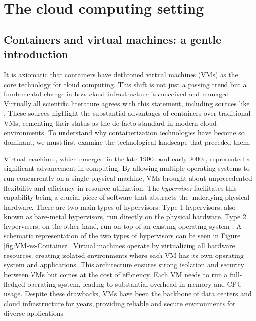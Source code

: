 \chapter{The cloud computing setting}\label{chap:cloudcomputing}


\section{Containers and virtual machines: a gentle introduction}\label{sec:chpt1-containers}

It is axiomatic that containers have dethroned virtual machines (VMs) as the
core technology for cloud computing. This shift is not just a passing trend but
a fundamental change in how cloud infrastructure is conceived and managed.
Virtually all scientific literature agrees with this statement, including
sources like \cite{Casalicchio2020TheSI, Bentaleb2021,
  zhang2018comparativestudycontainersvirtual}. These sources highlight the
substantial advantages of containers over traditional VMs, cementing their
status as the de facto standard in modern cloud environments.
To understand why containerization technologies have become so dominant, we must
first examine the technological landscape that preceded them.

Virtual machines, which emerged in the late 1990s and early 2000s, represented a
significant advancement in computing. By allowing multiple operating systems to
run concurrently on a single physical machine, VMs brought about unprecedented
flexibility and efficiency in resource utilization. The \textit{hypervisor}
facilitates this capability being a crucial piece of software that abstracts the
underlying physical hardware. There are two main types of hypervisors: Type 1
hypervisors, also known as bare-metal hypervisors, run directly on the physical
hardware. Type 2 hypervisors, on the other hand, run on top of an existing
operating system \cite{rodriguezharo-2012}. A schematic representation of the
two types of hypervisors can be seen in Figure \ref{fig:VM-vs-Container}.
Virtual machines operate by virtualizing all hardware resources, creating
isolated environments where each VM has its own operating system and
applications. This architecture ensures strong isolation and security between
VMs but comes at the cost of efficiency. Each VM needs to run a full-fledged
operating system, leading to substantial overhead in memory and CPU usage.
Despite these drawbacks, VMs have been the backbone of data centers and cloud
infrastructure for years, providing reliable and secure environments for diverse
applications.


